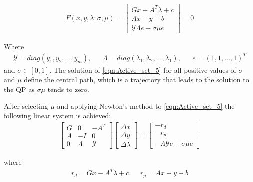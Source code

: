 \begin{equation}
\begin{aligned}
F(x,y,\lambda:\sigma,\mu) = 
\begin{bmatrix}
  	Gx-A^T\lambda+c\\
    Ax-y-b\\
    \mathcal{Y} \Lambda e - \sigma \mu e
  \end{bmatrix}
  =0
\end{aligned}
\label{eqn:Path_following_5}
\end{equation}

Where
\begin{equation*}
	\begin{aligned}
		\mathcal{Y} = diag(y_1,y_2,...,y_m), & & \Lambda = diag(\lambda_1 , \lambda_2,...,\lambda_1), & & e = (1,1,...,1)^T
	\end{aligned}
\end{equation*}
and  $\sigma \in [0,1]$. The solution of \ref{eqn:Active_set_5} for all positive values of $\sigma$ and $\mu$ define the central path, which is a trajectory that leads to the solution to the QP as $\sigma \mu$ tends to zero.

After selecting $\mu$ and applying Newton's method to \ref{eqn:Active_set_5} the following linear system is achieved:
\begin{equation}
	\begin{aligned}
		\begin{bmatrix}
			G & 0 & -A^T\\
			A & -I & 0\\
			0 & \Lambda & \mathcal{Y} 
		\end{bmatrix}
		\begin{bmatrix}
			\Delta x\\
			\Delta y\\
			\Delta \lambda
		\end{bmatrix}
		=
		\begin{bmatrix}
			-r_d\\
			-r_p\\
			-\Lambda \mathcal{Y}e + \sigma \mu e
		\end{bmatrix}
	\end{aligned}
	\label{eqn: Path_planning_6}
\end{equation}

where
\begin{equation*}
	\begin{aligned}
		r_d = Gx-A^T\lambda +c & & r_p = Ax-y-b
	\end{aligned}
\end{equation*}

